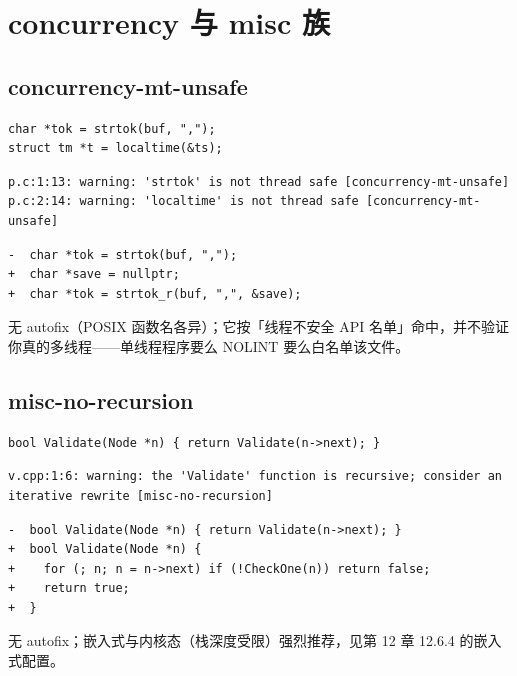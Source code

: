 \documentclass[12pt,a4paper,fontset=fandol]{ctexbook}
\begin{document}
\section{concurrency 与 misc 族}\label{sec:ch13-s7}
\subsection{concurrency-mt-unsafe}\label{sec:ch13-s7a}
\begin{lstlisting}[style=cppstyle]
char *tok = strtok(buf, ",");
struct tm *t = localtime(&ts);
\end{lstlisting}
\begin{lstlisting}[style=shellstyle]
p.c:1:13: warning: 'strtok' is not thread safe [concurrency-mt-unsafe]
p.c:2:14: warning: 'localtime' is not thread safe [concurrency-mt-unsafe]
\end{lstlisting}
\begin{lstlisting}[style=diffstyle]
-  char *tok = strtok(buf, ",");
+  char *save = nullptr;
+  char *tok = strtok_r(buf, ",", &save);
\end{lstlisting}
无 autofix（POSIX 函数名各异）；它按「线程不安全 API 名单」命中，并不验证你真的多线程——单线程程序要么 NOLINT 要么白名单该文件。
\subsection{misc-no-recursion}\label{sec:ch13-s7b}
\begin{lstlisting}[style=cppstyle]
bool Validate(Node *n) { return Validate(n->next); }
\end{lstlisting}
\begin{lstlisting}[style=shellstyle]
v.cpp:1:6: warning: the 'Validate' function is recursive; consider an iterative rewrite [misc-no-recursion]
\end{lstlisting}
\begin{lstlisting}[style=diffstyle]
-  bool Validate(Node *n) { return Validate(n->next); }
+  bool Validate(Node *n) {
+    for (; n; n = n->next) if (!CheckOne(n)) return false;
+    return true;
+  }
\end{lstlisting}
无 autofix；嵌入式与内核态（栈深度受限）强烈推荐，见第 12 章 12.6.4 的嵌入式配置。
\end{document}
